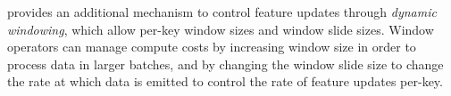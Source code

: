%
%

\system{} provides an additional mechanism to control feature updates through \textit{dynamic windowing}, which allow per-key window sizes and window slide sizes.
%
%
%
Window operators can manage compute costs by increasing window size in order to process data in larger batches,
and by changing the window slide size to change the rate at which data is emitted to control the rate of feature updates per-key.
%
%
%

